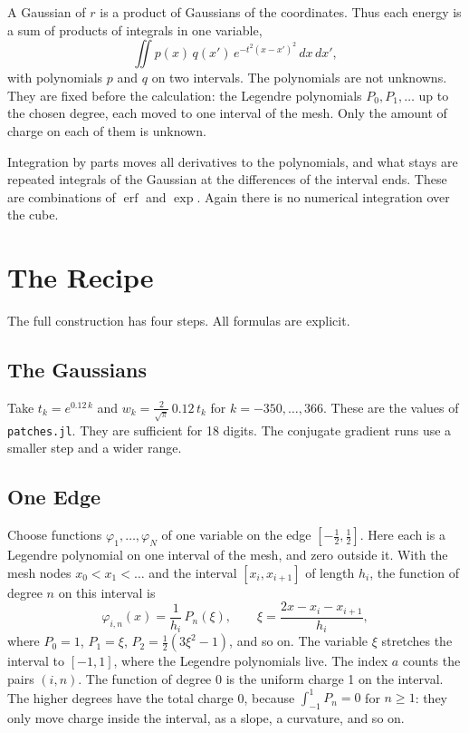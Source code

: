 \documentclass[journal]{IEEEtran}
\newcommand{\erf}{\operatorname{erf}}
\begin{document}
A Gaussian of $r$ is a product of Gaussians of the coordinates. Thus each energy is a sum of products of integrals in one variable,
\begin{equation}
\iint p(x)\, q(x')\, e^{-t^2 (x-x')^2}\, dx\, dx',
\end{equation}
with polynomials $p$ and $q$ on two intervals. The polynomials are not unknowns. They are fixed before the calculation: the Legendre polynomials $P_0, P_1, \dots$ up to the chosen degree, each moved to one interval of the mesh. Only the amount of charge on each of them is unknown.

Integration by parts moves all derivatives to the polynomials, and what stays are repeated integrals of the Gaussian at the differences of the interval ends. These are combinations of $\erf$ and $\exp$. Again there is no numerical integration over the cube.

\section{The Recipe}
\label{sec:recipe}
The full construction has four steps. All formulas are explicit.

\subsection{The Gaussians}
Take $t_k = e^{0.12\,k}$ and $w_k = \frac{2}{\sqrt\pi}\, 0.12\, t_k$ for $k = -350, \dots, 366$. These are the values of \texttt{patches.jl}. They are sufficient for 18 digits. The conjugate gradient runs use a smaller step and a wider range.

\subsection{One Edge}
Choose functions $\varphi_1, \dots, \varphi_N$ of one variable on the edge $[-\frac12, \frac12]$. Here each is a Legendre polynomial on one interval of the mesh, and zero outside it. With the mesh nodes $x_0 < x_1 < \dots$ and the interval $[x_i, x_{i+1}]$ of length $h_i$, the function of degree $n$ on this interval is
\begin{equation}
\varphi_{i,n}(x) = \frac{1}{h_i}\, P_n(\xi), \qquad \xi = \frac{2x - x_i - x_{i+1}}{h_i},
\end{equation}
where $P_0 = 1$, $P_1 = \xi$, $P_2 = \frac12(3\xi^2 - 1)$, and so on. The variable $\xi$ stretches the interval to $[-1, 1]$, where the Legendre polynomials live. The index $a$ counts the pairs $(i, n)$. The function of degree 0 is the uniform charge 1 on the interval. The higher degrees have the total charge 0, because $\int_{-1}^{1} P_n = 0$ for $n \ge 1$: they only move charge inside the interval, as a slope, a curvature, and so on.
\end{document}
